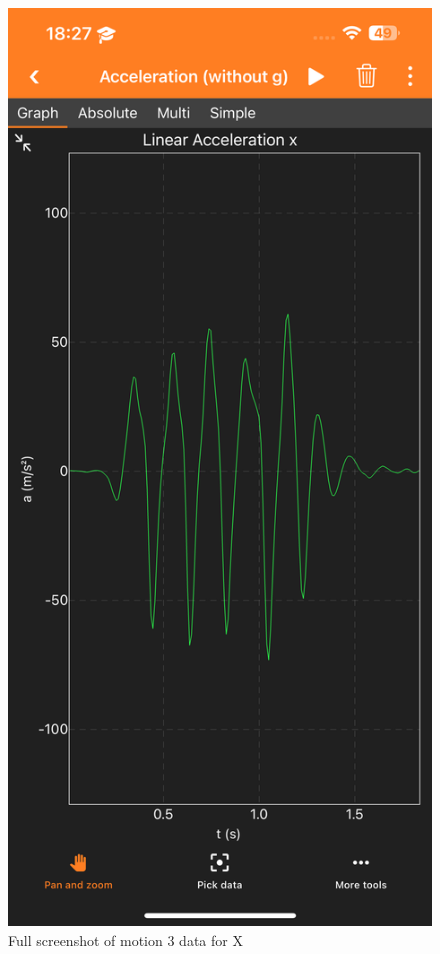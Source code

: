 \documentclass[idxtotoc,hyperref,openany]{labbook} %
\begin{document}
\begin{figure}[H] %
\begin{center}
\includegraphics[width=.55\linewidth]{images/Lab.03/Lab03Motion3X.PNG}
\end{center}
\caption{Full screenshot of motion 3 data for X}
\label{fig:Lab03-Motion3-X}
\end{figure}
\end{document}

